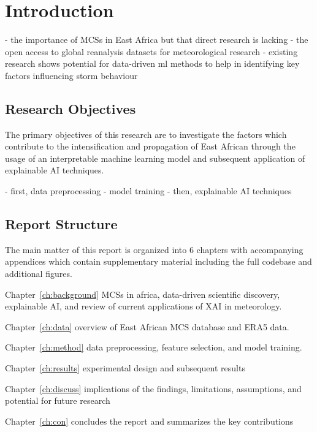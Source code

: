 \chapter{Introduction}
\label{ch:intro}

- the importance of MCSs in East Africa but that direct research is lacking
- the open access to global reanalysis datasets for meteorological research
- existing research shows potential for data-driven ml methods to help in identifying key factors influencing storm behaviour

\section{Research Objectives}

The primary objectives of this research are to investigate the factors which contribute to the intensification and propagation of East African  through the usage of an interpretable machine learning model and subsequent application of explainable AI techniques. 

- first, data preprocessing
- model training
- then, explainable AI techniques

\section{Report Structure}

The main matter of this report is organized into 6 chapters with accompanying appendices which contain supplementary material including the full codebase and additional figures.

Chapter~\ref{ch:background} MCSs in africa, data-driven scientific discovery, explainable AI, and review of current applications of XAI in meteorology. 

Chapter~\ref{ch:data} overview of East African MCS database and ERA5 data. 

Chapter~\ref{ch:method} data preprocessing, feature selection, and model training. 

Chapter~\ref{ch:results}  experimental design and subsequent results

Chapter~\ref{ch:discuss} implications of the findings, limitations, assumptions, and potential for future research

Chapter~\ref{ch:con} concludes the report and summarizes the key contributions

